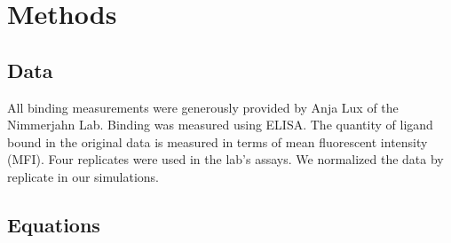 \section{Methods}

\subsection{Data}

All binding measurements were generously provided by Anja Lux of the Nimmerjahn Lab. Binding was measured using ELISA. The quantity of ligand bound in the original data is measured in terms of mean fluorescent intensity (MFI). Four replicates were used in the lab's assays. We normalized the data by replicate in our simulations.


\subsection*{Equations}

